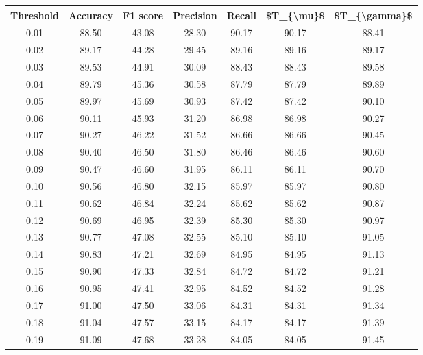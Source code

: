 \begin{tabular}{|c|c|c|c|c|c|c|}
\hline
 Threshold &  Accuracy &  F1 score &  Precision &  Recall &  \$T\_\{\textbackslash mu\}\$ &  \$T\_\{\textbackslash gamma\}\$ \\
\hline
      0.01 &     88.50 &     43.08 &      28.30 &   90.17 &      90.17 &         88.41 \\
      0.02 &     89.17 &     44.28 &      29.45 &   89.16 &      89.16 &         89.17 \\
      0.03 &     89.53 &     44.91 &      30.09 &   88.43 &      88.43 &         89.58 \\
      0.04 &     89.79 &     45.36 &      30.58 &   87.79 &      87.79 &         89.89 \\
      0.05 &     89.97 &     45.69 &      30.93 &   87.42 &      87.42 &         90.10 \\
      0.06 &     90.11 &     45.93 &      31.20 &   86.98 &      86.98 &         90.27 \\
      0.07 &     90.27 &     46.22 &      31.52 &   86.66 &      86.66 &         90.45 \\
      0.08 &     90.40 &     46.50 &      31.80 &   86.46 &      86.46 &         90.60 \\
      0.09 &     90.47 &     46.60 &      31.95 &   86.11 &      86.11 &         90.70 \\
      0.10 &     90.56 &     46.80 &      32.15 &   85.97 &      85.97 &         90.80 \\
      0.11 &     90.62 &     46.84 &      32.24 &   85.62 &      85.62 &         90.87 \\
      0.12 &     90.69 &     46.95 &      32.39 &   85.30 &      85.30 &         90.97 \\
      0.13 &     90.77 &     47.08 &      32.55 &   85.10 &      85.10 &         91.05 \\
      0.14 &     90.83 &     47.21 &      32.69 &   84.95 &      84.95 &         91.13 \\
      0.15 &     90.90 &     47.33 &      32.84 &   84.72 &      84.72 &         91.21 \\
      0.16 &     90.95 &     47.41 &      32.95 &   84.52 &      84.52 &         91.28 \\
      0.17 &     91.00 &     47.50 &      33.06 &   84.31 &      84.31 &         91.34 \\
      0.18 &     91.04 &     47.57 &      33.15 &   84.17 &      84.17 &         91.39 \\
      0.19 &     91.09 &     47.68 &      33.28 &   84.05 &      84.05 &         91.45 \\

\end{tabular}
